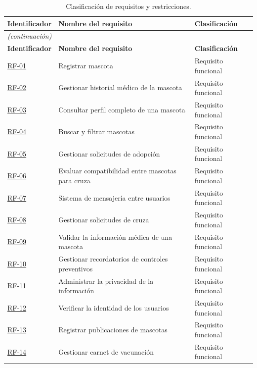 \documentclass[journal,onecolumn]{IEEEtran}
\begin{document}
	\begin{longtable}{@{}p{2.2cm} p{7.5cm} p{3.5cm}@{}}
		\caption{Clasificación de requisitos y restricciones.}
		\label{tab:lista_requisitos_completa} \\
		\hline
		\textbf{Identificador} & \textbf{Nombre del requisito} & \textbf{Clasificación} \\
		\hline
		\endfirsthead
		\multicolumn{3}{|l|}{\textit{(continuación)}} \\
		\hline
		\textbf{Identificador} & \textbf{Nombre del requisito} & \textbf{Clasificación} \\
		\hline
		\endhead
		\hline
		\endfoot
		\hyperref[tab:RF-01]{RF-01} & Registrar mascota & Requisito funcional \\
		\hline
		\hyperref[tab:RF-02]{RF-02} & Gestionar historial médico de la mascota & Requisito funcional \\
		\hline
		\hyperref[tab:RF-03]{RF-03} & Consultar perfil completo de una mascota & Requisito funcional \\
		\hline
		\hyperref[tab:RF-04]{RF-04} & Buscar y filtrar mascotas & Requisito funcional \\
		\hline
		\hyperref[tab:RF-05]{RF-05} & Gestionar solicitudes de adopción & Requisito funcional \\
		\hline
		\hyperref[tab:RF-06]{RF-06} & Evaluar compatibilidad entre mascotas para cruza & Requisito funcional \\
		\hline
		\hyperref[tab:RF-07]{RF-07} & Sistema de mensajería entre usuarios & Requisito funcional \\
		\hline
		\hyperref[tab:RF-08]{RF-08} & Gestionar solicitudes de cruza & Requisito funcional \\
		\hline
		\hyperref[tab:RF-09]{RF-09} & Validar la información médica de una mascota & Requisito funcional \\
		\hline
		\hyperref[tab:RF-10]{RF-10} & Gestionar recordatorios de controles preventivos & Requisito funcional \\
		\hline
		\hyperref[tab:RF-11]{RF-11} & Administrar la privacidad de la información & Requisito funcional \\
		\hline
		\hyperref[tab:RF-12]{RF-12} & Verificar la identidad de los usuarios & Requisito funcional \\
		\hline
		\hyperref[tab:RF-13]{RF-13} & Registrar publicaciones de mascotas & Requisito funcional \\
		\hline
		\hyperref[tab:RF-14]{RF-14} & Gestionar carnet de vacunación & Requisito funcional \\

\end{longtable}
\end{document}
